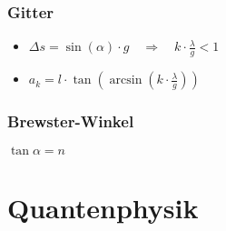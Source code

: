 \documentclass[paper = a4, twocolumn]{scrartcl}
\begin{document}
\subsubsection{Gitter}
\begin{itemize}
\item
	\( \Delta s = \sin(\alpha) \cdot g \quad \Rightarrow \quad k \cdot
	\frac{\lambda}{g} < 1 \)
\item
	\( a_k = l \cdot \tan(\arcsin(k \cdot \frac{\lambda}{g})) \)
\end{itemize}

\subsubsection{Brewster-Winkel}
\( \tan \alpha = n \)

\section{Quantenphysik}
\end{document}
